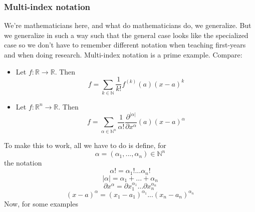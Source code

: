 \documentclass{article}
\newcommand{\reals}[0]{\mathbb{R}}
\newcommand{\nats}[0]{\mathbb{N}}
\begin{document}
\subsubsection{Multi-index notation}
We're mathematicians here, and what do mathematicians do, we generalize. But we generalize in such a way such that the general case looks like the specialized case so we don't have to remember different notation when teaching first-years and when doing research. Multi-index notation is a prime example. Compare:
\begin{itemize}

  \item Let \(f: \reals \to \reals\). Then
  \begin{equation}f = \sum_{k \in \nats}\frac{1}{k!}f^{(k)}(a)(x - a)^k\end{equation}

  \item Let \(f: \reals^n \to \reals\). Then
  \begin{equation}f = \sum_{\alpha \in \nats^n}\frac{1}{\alpha!}\frac{\partial^{|\alpha|}}{\partial x^\alpha}(a)(x - a)^\alpha\end{equation}

\end{itemize}
To make this to work, all we have to do is define, for
\begin{equation}\alpha = (\alpha_1,...,\alpha_n) \in \nats^n\end{equation}
the notation
\begin{equation}\alpha! = \alpha_1!...\alpha_n!\end{equation}
\begin{equation}|\alpha| = \alpha_1 + ... + \alpha_n\end{equation}
\begin{equation}\partial x^\alpha = \partial x_1^{\alpha_1} ... \partial x_n^{\alpha_n}\end{equation}
\begin{equation}(x - a)^\alpha = (x_1 - a_1)^{\alpha_1}...(x_n - a_n)^{\alpha_n}\end{equation}
Now, for some examples
\end{document}
